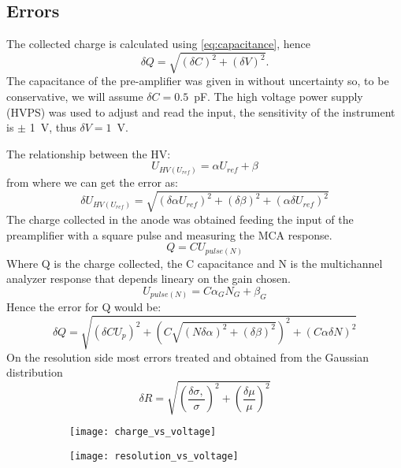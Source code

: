 \subsection{Errors}
\label{sec:errors}
The collected charge is calculated using \ref{eq:capacitance}, hence
\begin{equation}
  \label{eq:uncertainties}
  \delta Q = \sqrt{(\delta C)^2 + (\delta V)^2}.
\end{equation}
The capacitance of the pre-amplifier was given in \autocite{LabInstruction}
without uncertainty so, to be conservative, we will assume $\delta C =
0.5$~pF. The high voltage power supply (HVPS) was used to adjust and read the
input, the sensitivity of the instrument is $\pm$ 1~V, thus $\delta V = 1$~V.

The relationship between the HV:
\begin{equation}
  U_{HV(U_{ref})} = \alpha U_{ref} + \beta
\end{equation}
from where we can get the error as:
\begin{equation}
  \delta U_{HV(U_{ref})} = \sqrt{ (\delta \alpha  U_{ref})^2 + (\delta \beta)^2 + (\alpha \delta U_{ref})^2 }
\end{equation}
The charge collected in the anode was obtained feeding the input of the
preamplifier with a square pulse and measuring the MCA response.
\begin{equation}
  Q = C U_{pulse (N)}
\end{equation}
Where Q is the charge collected, the C capacitance and N is the multichannel
analyzer response that depends lineary on the gain chosen.
\begin{equation}
  U_{pulse (N)}= C\alpha_G N_G + \beta_G
\end{equation}
Hence the error for Q would be:
\begin{equation}
  \delta Q = \sqrt{(\delta CU_p )^2 + (C \sqrt{(N\delta \alpha)^2+(\delta \beta)^2} )^2 + (C\alpha \delta N)^2}
\end{equation}
On the resolution side most errors treated and obtained from the Gaussian
distribution
\begin{equation}
  \delta R = \sqrt{(\frac{\delta \sigma,}{\sigma})^2 + (\frac{\delta \mu}{\mu})^2}
\end{equation}
\begin{figure}[!h]
  \centering
  \begin{subfigure}[t]{.48\linewidth}
    \texttt{[image: charge\_vs\_voltage]}
    \caption{}
    \label{fig:charge_vs_voltage}
  \end{subfigure}
  \begin{subfigure}[t]{.48\linewidth}
    \texttt{[image: resolution\_vs\_voltage]}
    \caption{}
    \label{fig:resolution_vs_voltage}
  \end{subfigure}
  \caption{}
  \label{fig:results}
\end{figure}
